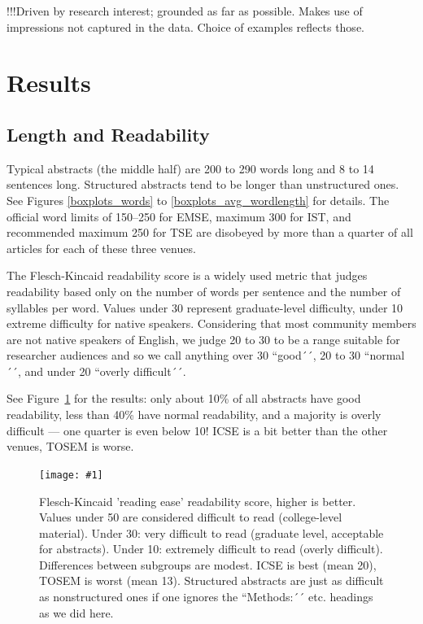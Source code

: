 \documentclass[10pt,journal,compsoc]{IEEEtran}
\newcommand{\ifarxiv}[1]{#1}  %
\newcommand{\Plot}[2]{%
	\begin{figure}[htb]%
		\centering\texttt{[image: \#1]}%
		\vspace{-4mm}\caption{#2}\label{#1}%
	\end{figure}}
\begin{document}
!!!Driven by research interest; grounded as far as possible.
Makes use of impressions not captured in the data.
Choice of examples reflects those.


\section{Results}

\subsection{Length and Readability}

Typical abstracts (the middle half) are 200 to 290 words long
and 8 to 14 sentences long.
Structured abstracts tend to be longer than unstructured ones.
\ifarxiv{See Figures \ref{boxplots_words} to \ref{boxplots_avg_wordlength} for details.}
The official word limits of 
150--250 for EMSE,
maximum 300 for IST, and
recommended maximum 250 for TSE
are disobeyed by more than a quarter of all articles for each of these three venues.

The Flesch-Kincaid readability score is a widely used metric that judges
readability based only on the number of words per sentence and the number of 
syllables per word. 
Values under 30 represent graduate-level difficulty,
under 10 extreme difficulty for native speakers.
Considering that most community members are not native speakers of English,
we judge 20 to 30 to be a range suitable for researcher audiences and so 
we call anything over 30 ``good´´, 
20 to 30 ``normal´´, and 
under 20 ``overly difficult´´.

See Figure~\ref{boxplots_fkscore} for the results:
only about 10\% of all abstracts have good readability,
less than 40\% have normal readability,
and a majority is overly difficult --- one quarter is even below 10!
ICSE is a bit better than the other venues,
TOSEM is worse.

\Plot{boxplots_fkscore}{%
	Flesch-Kincaid 'reading ease' readability score, higher is better.
    Values under 50 are considered difficult to read (college-level material).
    Under 30: very difficult to read (graduate level, acceptable for abstracts).
	Under 10: extremely difficult to read (overly difficult).
    Differences between subgroups are modest. 
	ICSE is best (mean 20), TOSEM is worst (mean 13).
    Structured abstracts are just as difficult as nonstructured ones
    if one ignores the ``Methods:´´ etc. headings as we did here.
}
\end{document}

